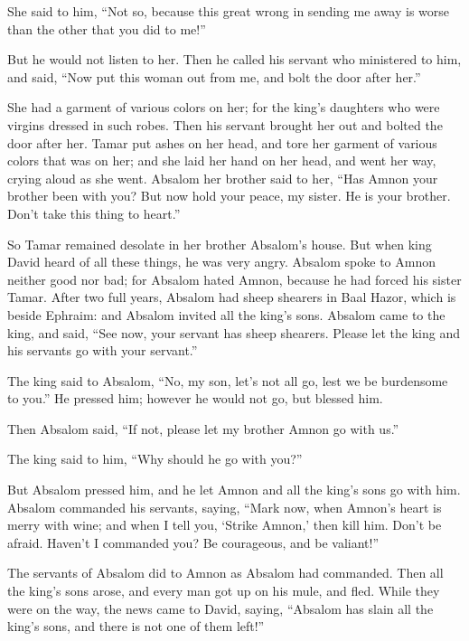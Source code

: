 {\par }{\PP {}She said to him, “Not so, because this great wrong in sending me away is worse than the other that you did to me!”
\par }{\PP But he would not listen to her.
Then he called his servant who ministered to him, and said, “Now put this woman out from me, and bolt the door after her.”
\par }{\PP {}She had a garment of various colors on her; for the king’s daughters who were virgins dressed in such robes. Then his servant brought her out and bolted the door after her.
Tamar put ashes on her head, and tore her garment of various colors that was on her; and she laid her hand on her head, and went her way, crying aloud as she went.
Absalom her brother said to her, “Has Amnon your brother been with you? But now hold your peace, my sister. He is your brother. Don’t take this thing to heart.”
\par }{\PP So Tamar remained desolate in her brother Absalom’s house.
But when king David heard of all these things, he was very angry.
Absalom spoke to Amnon neither good nor bad; for Absalom hated Amnon, because he had forced his sister Tamar.
After two full years, Absalom had sheep shearers in Baal Hazor, which is beside Ephraim: and Absalom invited all the king’s sons.
Absalom came to the king, and said, “See now, your servant has sheep shearers. Please let the king and his servants go with your servant.”
\par }{\PP {}The king said to Absalom, “No, my son, let’s not all go, lest we be burdensome to you.” He pressed him; however he would not go, but blessed him.
\par }{\PP {}Then Absalom said, “If not, please let my brother Amnon go with us.”
\par }{\PP The king said to him, “Why should he go with you?”
\par }{\PP {}But Absalom pressed him, and he let Amnon and all the king’s sons go with him.
Absalom commanded his servants, saying, “Mark now, when Amnon’s heart is merry with wine; and when I tell you, ‘Strike Amnon,’ then kill him. Don’t be afraid. Haven’t I commanded you? Be courageous, and be valiant!”
\par }{\PP {}The servants of Absalom did to Amnon as Absalom had commanded. Then all the king’s sons arose, and every man got up on his mule, and fled.
While they were on the way, the news came to David, saying, “Absalom has slain all the king’s sons, and there is not one of them left!”
}

